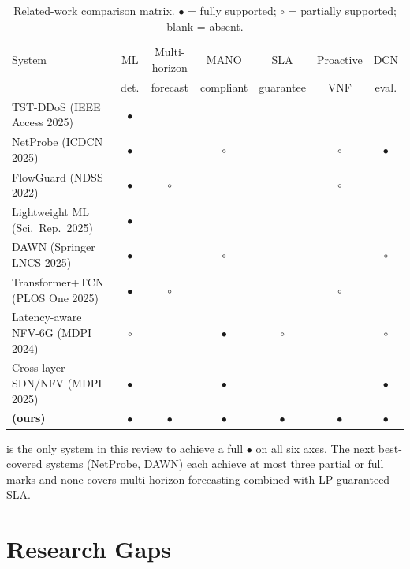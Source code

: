 \begin{table}[H]
\centering
\footnotesize
\caption{Related-work comparison matrix. $\bullet$ = fully supported;
$\circ$ = partially supported; blank = absent.}
\label{tab:related}
\begin{tabular}{@{}lcccccc@{}}
\toprule
System & ML & Multi-horizon & MANO & SLA & Proactive & DCN \\
       & det. & forecast & compliant & guarantee & VNF & eval. \\
\midrule
TST-DDoS (IEEE Access 2025)          & $\bullet$ &            &            &            &            &            \\
NetProbe (ICDCN 2025)                & $\bullet$ &            & $\circ$    &            & $\circ$    & $\bullet$  \\
FlowGuard (NDSS 2022)                & $\bullet$ & $\circ$    &            &            & $\circ$    &            \\
Lightweight ML (Sci.~Rep.~2025)      & $\bullet$ &            &            &            &            &            \\
DAWN (Springer LNCS 2025)            & $\bullet$ &            & $\circ$    &            &            & $\circ$    \\
Transformer+TCN (PLOS One 2025)      & $\bullet$ & $\circ$    &            &            & $\circ$    &            \\
Latency-aware NFV-6G (MDPI 2024)     & $\circ$   &            & $\bullet$  & $\circ$    &            & $\circ$    \\
Cross-layer SDN/NFV (MDPI 2025)      & $\bullet$ &            & $\bullet$  &            &            & $\bullet$  \\
\midrule
\textbf{\padonap{} (ours)}
  & \textbf{$\bullet$}
  & \textbf{$\bullet$}
  & \textbf{$\bullet$}
  & \textbf{$\bullet$}
  & \textbf{$\bullet$}
  & \textbf{$\bullet$} \\
\bottomrule
\end{tabular}
\end{table}

\padonap{} is the only system in this review to achieve a full $\bullet$
on all six axes. The next best-covered systems (NetProbe, DAWN) each
achieve at most three partial or full marks and none covers multi-horizon
forecasting combined with LP-guaranteed SLA.

\section{Research Gaps}
\label{sec:gaps}

